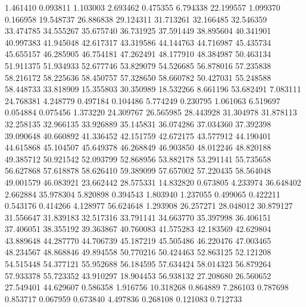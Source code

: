 1.461410
0.093811
1.103003
2.693462
0.475355
6.794338
22.199557
1.099370
0.166958
19.548737
26.886838
29.124311
31.713261
32.166485
32.546359
33.474785
34.555267
35.675740
36.731925
37.591449
38.895604
40.341901
40.997383
41.945048
42.617317
43.319586
44.144763
44.716987
45.435734
45.655157
46.285905
46.754181
47.262491
48.177910
48.384987
50.463134
51.911375
51.934933
52.677746
53.829079
54.526685
56.878016
57.235838
58.216172
58.225636
58.450757
57.328650
58.660782
50.427031
55.248588
58.448733
33.818909
15.355803
30.350989
18.532266
8.661196
53.682491
7.083111
24.768381
4.248779
0.497184
0.104486
5.774249
0.230795
1.061063
6.519697
0.054884
0.075456
1.373220
24.309767
26.565985
28.443928
31.304978
31.878113
32.258135
32.966135
33.926889
35.145831
36.074286
37.034360
37.392398
39.090648
40.660892
41.336452
42.151759
42.672175
43.577912
44.190401
44.615868
45.104507
45.649378
46.268849
46.903850
48.012246
48.820188
49.385712
50.921542
52.093799
52.868956
53.882178
53.291141
55.735658
56.627868
57.618878
58.626410
59.389099
57.657002
57.220435
58.564048
49.001579
46.083921
23.662442
28.575331
14.832820
0.673805
4.233974
36.648402
2.662884
35.978304
5.820898
0.394543
1.803940
1.237055
0.499065
0.422211
0.543176
0.414266
4.128977
56.624648
1.293908
26.257271
28.048012
30.879127
31.556647
31.839183
32.517316
33.791141
34.663770
35.397998
36.406151
37.406051
38.355192
39.363867
40.760083
41.575283
42.183569
42.629804
43.889648
44.287770
44.706739
45.187219
45.505486
46.220476
47.003465
48.234567
48.868846
49.894558
50.770216
50.424463
52.863125
52.121208
54.515448
54.377121
55.952688
56.184595
57.634424
58.014323
56.879264
57.933378
55.723352
43.910297
18.904453
56.938132
27.208680
26.560652
27.549401
44.629607
0.586358
1.916756
10.318268
0.864889
7.286103
0.787698
0.853717
0.067959
0.673840
4.497836
0.268108
0.121083
0.712733
